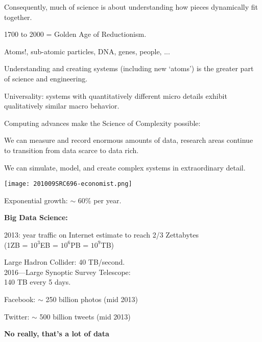 \begin{frame}[plain]
      Consequently, much of science is about understanding
      how pieces dynamically fit together.
    
      1700 to 2000 = Golden Age of Reductionism.
      
       
        Atoms!, sub-atomic particles, DNA, genes, people, ...
      
    
      Understanding and creating systems (including new `atoms')
      is the greater part of science and engineering.
    
      Universality: systems with quantitatively different micro details
      exhibit qualitatively similar macro behavior.
    
      Computing advances make the Science of Complexity possible:
      
      
        We can measure and record enormous amounts of data,
        research areas continue to transition from data scarce to data rich.
      
        We can simulate, model, and create complex systems
        in extraordinary detail.  
      
    
  







      
    \texttt{[image: 201009SRC696-economist.png]}
    
     
      Exponential growth: $\sim$ 60\% per year.
    
    
    \textbf{Big Data Science:}
    
     
      2013: year traffic on Internet estimate to reach 2/3 Zettabytes \\
      (1ZB = $10^3$EB = $10^6$PB = $10^9$TB)
     
      Large Hadron Collider: 40 TB/second.\\
     
      2016---Large Synoptic Survey Telescope:\\
      140 TB every 5 days.
     
      Facebook: $\sim$ 250 billion photos (mid 2013)
     
      Twitter: $\sim$ 500 billion tweets (mid 2013)
    
          
  

\begin{frame}[plain]
  \textbf{No really, that's a lot of data}


\end{frame}
\end{frame}
